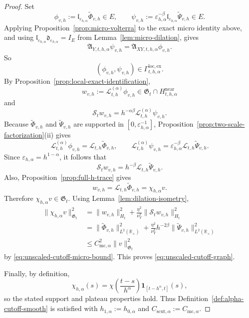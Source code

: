 \documentclass[11pt,a4paper]{amsart}
\theoremstyle{plain}
\theoremstyle{definition}
\theoremstyle{remark}
\newcommand{\R}{\mathbb{R}}
\newcommand{\one}{\mathbf 1}
\begin{document}
\begin{proof}
Set
\[
\phi_{v,h}:=
\mathfrak l_{\varepsilon_{h,\alpha}}\widetilde\Phi_{v,h}\in E,
\qquad
\psi_{v,h}:=
\varepsilon_{h,\alpha}^{-\beta}
\mathfrak l_{\varepsilon_{h,\alpha}}\widetilde\Psi_{v,h}\in E.
\]
Applying Proposition~\ref{prop:micro-volterra} to the exact micro identity above, and using
\(\mathfrak l_{\varepsilon_{h,\alpha}}\mathfrak d_{\varepsilon_{h,\alpha}}=I_E\) from
Lemma~\ref{lem:micro-dilation}, gives
\[
\mathfrak A_{Y,t,h,\alpha}\psi_{v,h}
=
\mathfrak A_{XY,t,h,\alpha}\phi_{v,h}.
\]
So
\[
(\phi_{v,h},\psi_{v,h})\in\Gamma_{t,h,\alpha}^{\mathrm{loc,ex}}.
\]
By Proposition~\ref{prop:local-exact-identification},
\[
w_{v,h}:=\mathcal L_{t,h}^{(\alpha)}\phi_{v,h}\in \mathfrak G_t\cap H_{t,h,\alpha}^{\mathrm{near}}
\]
and
\[
\mathcal S_t w_{v,h}
=
h^{-\alpha\beta}\mathcal L_{t,h}^{(\alpha)}\psi_{v,h}.
\]
Because \(\widetilde\Phi_{v,h}\) and \(\widetilde\Psi_{v,h}\) are supported in
\([0,\varepsilon_{h,\alpha}^{-1}]\), Proposition~\ref{prop:two-scale-factorization}(ii) gives
\[
\mathcal L_{t,h}^{(\alpha)}\phi_{v,h}
=
\mathcal L_{t,h}\widetilde\Phi_{v,h},
\qquad
\mathcal L_{t,h}^{(\alpha)}\psi_{v,h}
=
\varepsilon_{h,\alpha}^{-\beta}\mathcal L_{t,h}\widetilde\Psi_{v,h}.
\]
Since \(\varepsilon_{h,\alpha}=h^{1-\alpha}\), it follows that
\[
\mathcal S_t w_{v,h}
=
h^{-\beta}\mathcal L_{t,h}\widetilde\Psi_{v,h}.
\]
Also, Proposition~\ref{prop:full-h-trace} gives
\[
w_{v,h}
=
\mathcal L_{t,h}\widetilde\Phi_{v,h}
=
\chi_{h,\alpha}v.
\]
Therefore \(\chi_{h,\alpha}v\in\mathfrak G_t\). Using Lemma~\ref{lem:dilation-isometry},
\begin{align*}
\|\chi_{h,\alpha}v\|_{\mathfrak G_t}^2
&=
\|w_{v,h}\|_{H_t}^2
+
\frac{\eta^2}{\nu_Y^2}
\|\mathcal S_t w_{v,h}\|_{H_t}^2 \\
&=
\|\widetilde\Phi_{v,h}\|_{L^2(\R_+)}^2
+
\frac{\eta^2}{\nu_Y^2}
h^{-2\beta}
\|\widetilde\Psi_{v,h}\|_{L^2(\R_+)}^2 \\
&\le
C_{\mathrm{mc},\alpha}^2\|v\|_{\mathfrak G_t}^2
\end{align*}
by \eqref{eq:unscaled-cutoff-micro-bound}. This proves \eqref{eq:unscaled-cutoff-graph}.

Finally, by definition,
\[
\chi_{h,\alpha}(s)
=
\chi\!\left(\frac{t-s}{h^\alpha}\right)\one_{[t-h^\alpha,t]}(s),
\]
so the stated support and plateau properties hold. Thus Definition~\ref{def:alpha-cutoff-smooth}
is satisfied with \(h_{1,\alpha}:=h_{0,\alpha}\) and \(C_{\mathrm{scut},\alpha}:=C_{\mathrm{mc},\alpha}\).
\end{proof}
\end{document}

